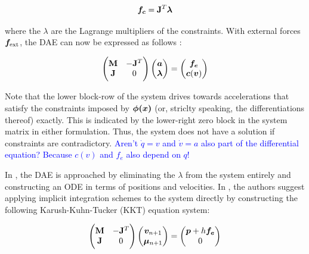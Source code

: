 \begin{equation}\label{eq:constraint-forces}
    \bm{f_c} = \mathbf{J}^T \bm{\lambda}
\end{equation}

where the $\lambda$ are the Lagrange multipliers of the constraints. With external forces $\bm{f}_{\text{ext}}$, the DAE can now be 
expressed as follows 
\cite{ascher1995}:

\[
    \begin{pmatrix}
        \mathbf{M} & -\mathbf{J}^T \\
        \mathbf{J} & 0
    \end{pmatrix}
    \begin{pmatrix}
        \bm{a} \\
        \bm{\lambda}
    \end{pmatrix}
    =
    \begin{pmatrix}
        \bm{f_e} \\
        \bm{c}(\bm{v})
    \end{pmatrix}
\]

Note that the lower block-row of the system drives towards accelerations that satisfy the constraints imposed by $\bm{\phi(x)}$ (or, striclty 
speaking, the differentiations thereof) exactly. This is indicated by the lower-right zero block in the system matrix in either formulation. 
Thus, the system does not have a solution if constraints are contradictory. \textcolor{blue}{Aren't $\dot{q} = v$ and $\dot{v} = a$ 
also part of the differential equation? Because $c(v)$ and $f_e$ also depend on $q$!}

In \cite{ascher1995}, the DAE is approached by eliminating the $\lambda$ from the system entirely and constructing an ODE in terms of positions
and velocities. In \cite{tournier2015}, the authors suggest applying implicit integration schemes to the system directly by constructing the 
following Karush-Kuhn-Tucker (KKT) equation system:

\[
\begin{pmatrix}
    \mathbf{M} & -\mathbf{J}^T \\
    \mathbf{J} & 0
\end{pmatrix}
\begin{pmatrix}
    \bm{v}_{n+1} \\
    \bm{\mu}_{n+1}
\end{pmatrix}
=
\begin{pmatrix}
    \bm{p} + h\bm{f_e} \\
    0
\end{pmatrix}
\]

